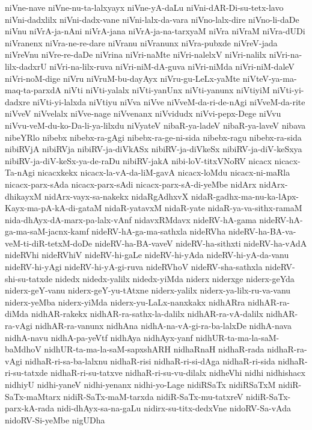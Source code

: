 {niVne-nave
niVne-nu-ta-lalxyayx
niVne-yA-daLu
niVni-dAR-Di-su-tetx-lavo
niVni-dadxlilx
niVni-dadx-vane
niVni-lalx-da-vara
niVno-lalx-dire
niVno-li-daDe
niVnu
niVrA-ja-nAni
niVrA-jana
niVrA-ja-na-tarxyaM
niVra
niVraM
niVra-dUDi
niVranenx
niVra-ne-re-dare
niVranu
niVranunx
niVra-pubxde
niVreV-jada
niVreVnu
niVre-re-daDe
niVrina
niVri-naMte
niVri-nalelxV
niVri-nalilx
niVri-na-lilx-dadxrU
niVri-na-lilx-ruva
niVri-niM-dA-guva
niVri-niMda
niVri-niM-daleV
niVri-noM-dige
niVru
niVruM-bu-dayAyx
niVru-gu-LeLx-yaMte
niVteV-ya-ma-maq-ta-parxdA
niVti
niVti-yalalx
niVti-yanUnx
niVti-yanunx
niVtiyiM
niVti-yi-dadxre
niVti-yi-lalxda
niVtiyu
niVva
niVve
niVveM-da-ri-de-nAgi
niVveM-da-rite
niVveV
niVvelalx
niVve-nage
niVvenanx
niVvidudx
niVvi-pepx-Dege
niVvu
niVvu-veM-du-ko-Da-li-ya-lilxdu
niVyateV
nibaR-ya-ladeV
nibaR-ya-laveV
nibava
nibeYRlo
nibebx
nibebx-ra-gAgi
nibebx-ra-ge-ni-sida
nibebx-ragu
nibebx-ra-sida
nibiRVjA
nibiRVja
nibiRV-ja-diVkASx
nibiRV-ja-diVkeSx
nibiRV-ja-diV-keSxya
nibiRV-ja-diV-keSx-ya-de-raDu
nibiRV-jakA
nibi-loV-titxVNoRV
nicacx
nicacx-Ta-nAgi
nicacxkekx
nicacx-la-vA-da-liM-gavA
nicacx-loMdu
nicacx-ni-maRla
nicacx-parx-sAda
nicacx-parx-sAdi
nicacx-parx-sA-di-yeMbe
nidArx
nidArx-dhikayxM
nidArx-vayx-sa-nakekx
nidaRgAdhxvX
nidaR-gadhx-ma-nu-ka-lApx-Kayx-ma-pA-kA-di-gataM
nidaR-yatavxM
nidaR-yate
nidaR-ya-va-sithx-ramaM
nida-dhAyx-dA-marx-pa-lalx-vAnf
nidavxRMdavx
nideRV-hA-gama
nideRV-hA-ga-ma-saM-jacnx-kamf
nideRV-hA-ga-ma-sathxla
nideRVha
nideRV-ha-BA-va-veM-ti-diR-tetxM-doDe
nideRV-ha-BA-vaveV
nideRV-ha-sithxti
nideRV-ha-vAdA
nideRVhi
nideRVhiV
nideRV-hi-gaLe
nideRV-hi-yAda
nideRV-hi-yA-da-vanu
nideRV-hi-yAgi
nideRV-hi-yA-gi-ruva
nideRVhoV
nideRV-sha-sathxla
nideRV-shi-su-tatxde
nidedx
nidedx-yalilx
nidedx-yiMda
niderx
niderxge
niderx-geYda
niderx-geY-vanu
niderx-geY-yu-tAtxne
niderx-yalilx
niderx-ya-lilx-ru-va-vanu
niderx-yeMba
niderx-yiMda
niderx-yu-LaLx-nanxkakx
nidhARra
nidhAR-ra-diMda
nidhAR-rakekx
nidhAR-ra-sathx-la-dalilx
nidhAR-ra-vA-dalilx
nidhAR-ra-vAgi
nidhAR-ra-vanunx
nidhAna
nidhA-na-vA-gi-ra-ba-lalxDe
nidhA-nava
nidhA-navu
nidhA-pa-yeVtf
nidhAya
nidhAyx-yanf
nidhUR-ta-ma-la-saM-baMdhoV
nidhUR-ta-ma-la-saM-sapxshARH
nidhaRnaH
nidhaR-rada
nidhaR-ra-vAgi
nidhaR-ri-sa-ba-lalxnu
nidhaR-risi
nidhaR-ri-si-dAga
nidhaR-ri-sida
nidhaR-ri-su-tatxde
nidhaR-ri-su-tatxve
nidhaR-ri-su-vu-dilalx
nidheVhi
nidhi
nidhishacx
nidhiyU
nidhi-yaneV
nidhi-yenanx
nidhi-yo-Lage
nidiRSaTx
nidiRSaTxM
nidiR-SaTx-maMtarx
nidiR-SaTx-maM-tarxda
nidiR-SaTx-mu-tatxreV
nidiR-SaTx-parx-kA-rada
nidi-dhAyx-sa-na-gaLu
nidirx-su-titx-dedxVne
nidoRV-Sa-vAda
nidoRV-Si-yeMbe
nigUDha
}
